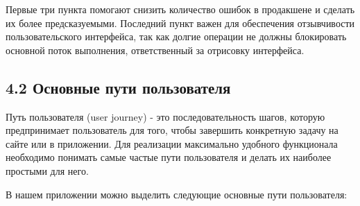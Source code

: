 \noindent Первые три пункта помогают снизить количество ошибок в продакшене и сделать их более предсказуемыми. Последний пункт важен для обеспечения отзывчивости пользовательского интерфейса, так как долгие операции не должны блокировать основной поток выполнения, ответственный за отрисовку интерфейса.

\subsection*{4.2 Основные пути пользователя}

Путь пользователя (user journey) - это последовательность шагов, которую предпринимает пользователь для того, чтобы завершить конкретную задачу на сайте или в приложении. Для реализации максимально удобного функционала необходимо понимать самые частые пути пользователя и делать их наиболее простыми для него.

В нашем приложении можно выделить следующие основные пути пользователя:

